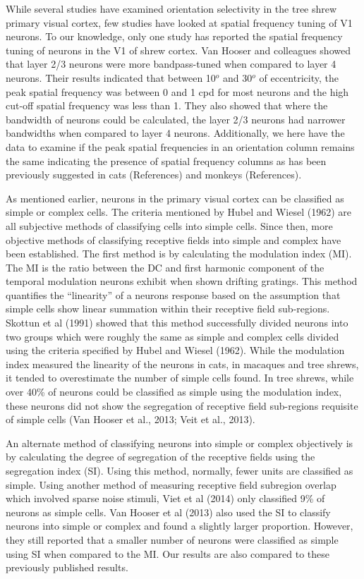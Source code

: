 	While several studies have examined orientation selectivity in the tree shrew primary visual cortex, few studies have looked at spatial frequency tuning of V1 neurons. To our knowledge, only one study has reported the spatial frequency tuning of neurons in the V1 of shrew cortex. Van Hooser and colleagues showed that layer 2/3 neurons were more bandpass-tuned when compared to layer 4 neurons. Their results indicated that between 10$^o$ and 30$^o$ of eccentricity, the peak spatial frequency was between 0 and 1 cpd for most neurons and the high cut-off spatial frequency was less than 1. They also showed that where the bandwidth of neurons could be calculated, the layer 2/3 neurons had narrower bandwidths when compared to layer 4 neurons. Additionally, we here have the data to examine if the peak spatial frequencies in an orientation column remains the same indicating the presence of spatial frequency columns as has been previously suggested in cats (References) and monkeys (References).
	
	As mentioned earlier, neurons in the primary visual cortex can be classified as simple or complex cells. The criteria mentioned by Hubel and Wiesel (1962) are all subjective methods of classifying cells into simple cells. Since then, more objective methods of classifying receptive fields into simple and complex have been established. The first method is by calculating the modulation index (MI). The MI is the ratio between the DC and first harmonic component of the temporal modulation neurons exhibit when shown drifting gratings. This method quantifies the “linearity” of a neurons response based on the assumption that simple cells show linear summation within their receptive field sub-regions. Skottun et al (1991) showed that this method successfully divided neurons into two groups which were roughly the same as simple and complex cells divided using the criteria specified by Hubel and Wiesel (1962). While the modulation index measured the linearity of the neurons in cats, in macaques and tree shrews, it tended to overestimate the number of simple cells found. In tree shrews, while over 40\% of neurons could be classified as simple using the modulation index, these neurons did not show the segregation of receptive field sub-regions requisite of simple cells (Van Hooser et al., 2013; Veit et al., 2013).
	
	An alternate method of classifying neurons into simple or complex objectively is by calculating the degree of segregation of the receptive fields using the segregation index (SI). Using this method, normally, fewer units are classified as simple. Using another method of measuring receptive field subregion overlap which involved sparse noise stimuli, Viet et al (2014) only classified 9\% of neurons as simple cells. Van Hooser et al (2013) also used the SI to classify neurons into simple or complex and found a slightly larger proportion. However, they still reported that a smaller number of neurons were classified as simple using SI when compared to the MI. Our results are also compared to these previously published results.
	
